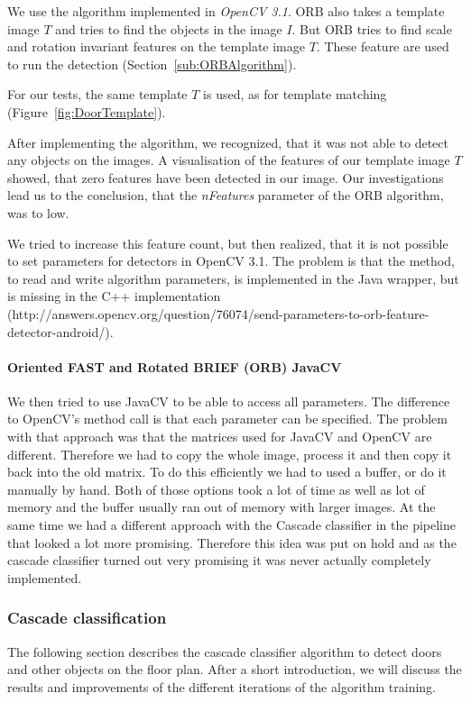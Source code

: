 We use the algorithm implemented in \textit{OpenCV 3.1}. ORB also takes a template image $T$ and tries to find the objects in the image $I$. But ORB tries to find scale and rotation invariant features on the template image $T$. These feature are used to run the detection (Section~\ref{sub:ORBAlgorithm}). 

For our tests, the same template $T$ is used, as for template matching (Figure~\ref{fig:DoorTemplate}).

After implementing the algorithm, we recognized, that it was not able to detect any objects on the images. A visualisation of the features of our template image $T$ showed, that zero features have been detected in our image. Our investigations lead us to the conclusion, that the \textit{nFeatures} parameter of the ORB algorithm, was to low.

We tried to increase this feature count, but then realized, that it is not possible to set parameters for detectors in OpenCV 3.1. The problem is that the method, to read and write algorithm parameters, is implemented in the Java wrapper, but is missing in the C++ implementation (http://answers.opencv.org/question/76074/send-parameters-to-orb-feature-detector-android/).

\paragraph{Oriented FAST and Rotated BRIEF (ORB) JavaCV}
\label{sub:ImpORBJVCV}
We then tried to use JavaCV to be able to access all parameters. The difference to OpenCV's method call is that each parameter can be specified. The problem with that approach was that the matrices used for JavaCV and OpenCV are different. Therefore we had to copy the whole image, process it and then copy it back into the old matrix. To do this efficiently we had to used a buffer, or do it manually by hand. Both of those options took a lot of time as well as lot of memory and the buffer usually ran out of memory with larger images. At the same time we had a different approach with the Cascade classifier in the pipeline that looked a lot more promising. Therefore this idea was put on hold and as the cascade classifier turned out very promising it was never actually completely implemented.

\subsubsection{Cascade classification}
\label{sub:ImpCascadeClassifier}
The following section describes the cascade classifier algorithm to detect doors and other objects on the floor plan. After a short introduction, we will discuss the results and improvements of the different iterations of the algorithm training.

